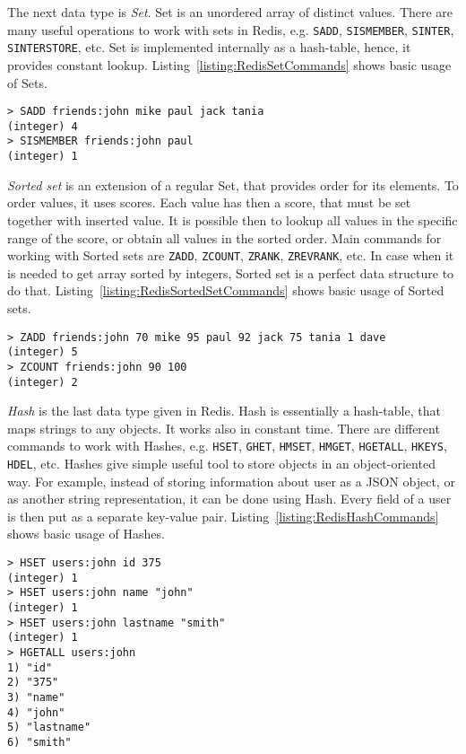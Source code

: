 The next data type is \textit{Set}.
Set is an unordered array of distinct values.
There are many useful operations to work with sets in Redis, e.g. \lstinline{SADD}, \lstinline{SISMEMBER}, \lstinline{SINTER}, \lstinline{SINTERSTORE}, etc.
Set is implemented internally as a hash-table, hence, it provides constant lookup.
Listing~\ref{listing:RedisSetCommands} shows basic usage of Sets.

\begin{lstlisting}[float=h, caption=Usage of Set data type commands., label=listing:RedisSetCommands]
> SADD friends:john mike paul jack tania
(integer) 4
> SISMEMBER friends:john paul
(integer) 1 
\end{lstlisting}

\textit{Sorted set} is an extension of a regular Set, that provides order for its elements.
To order values, it uses scores.
Each value has then a score, that must be set together with inserted value.
It is possible then to lookup all values in the specific range of the score, or obtain all values in the sorted order.
Main commands for working with Sorted sets are \lstinline{ZADD}, \lstinline{ZCOUNT}, \lstinline{ZRANK}, \lstinline{ZREVRANK}, etc.
In case when it is needed to get array sorted by integers, Sorted set is a perfect data structure to do that.
Listing~\ref{listing:RedisSortedSetCommands} shows basic usage of Sorted sets.

\begin{lstlisting}[float=h, caption=Usage of Sorted set data type commands., label=listing:RedisSortedSetCommands]
> ZADD friends:john 70 mike 95 paul 92 jack 75 tania 1 dave
(integer) 5
> ZCOUNT friends:john 90 100
(integer) 2
\end{lstlisting}

\textit{Hash} is the last data type given in Redis.
Hash is essentially a hash-table, that maps strings to any objects.
It works also in constant time.
There are different commands to work with Hashes, e.g. \lstinline{HSET}, \lstinline{GHET}, \lstinline{HMSET}, \lstinline{HMGET}, \lstinline{HGETALL}, \lstinline{HKEYS}, \lstinline{HDEL}, etc.
Hashes give simple useful tool to store objects in an object-oriented way.
For example, instead of storing information about user as a JSON object, or as another string representation, it can be done using Hash.
Every field of a user is then put as a separate key-value pair.
Listing~\ref{listing:RedisHashCommands} shows basic usage of Hashes.

\begin{lstlisting}[float=h, caption=Usage of Hash data type commands., label=listing:RedisHashCommands]
> HSET users:john id 375
(integer) 1
> HSET users:john name "john"
(integer) 1
> HSET users:john lastname "smith"
(integer) 1
> HGETALL users:john
1) "id"
2) "375"
3) "name"
4) "john"
5) "lastname"
6) "smith"
\end{lstlisting}

